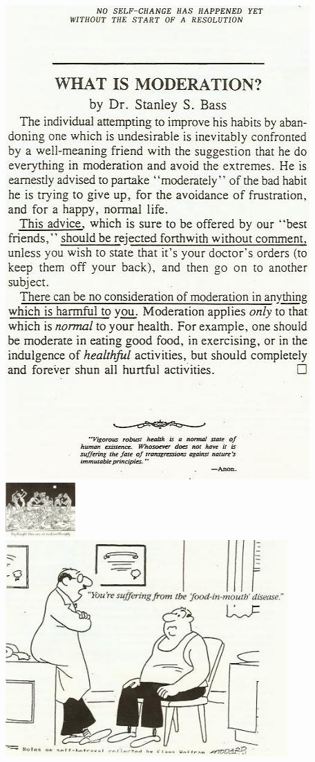 \documentclass[landscape,twocolumn,letterpaper]{article}
\begin{document}
\includegraphics[height=\textheight,bb=0 0 440 685]{./p4.jpg}
\clearpage%
\includegraphics[width=0.2\textwidth,bb=0 0 463 334]{./p6.jpg}
\clearpage%
\includegraphics[width=4.25in,bb=0 0 470 359]{./p7.jpg}
\end{document}
